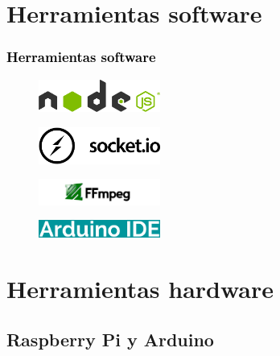 \documentclass[xcolor=x11names,compress]{beamer}
\theoremstyle{cuadrado}
\begin{document}
{{\begin{adjustwidth}{-2em}{-1em}
\end{adjustwidth}

}


\section{Herramientas software}

\frametitle{\textcolor{black}{Herramientas software}}

\begin{figure}[H]
  \includegraphics[width=4cm]{nodejs-logo.png}
\end{figure}

\begin{figure}[H]
  \includegraphics[width=4cm]{socketio-logo.png}
\end{figure}


\begin{figure}[H]
  \includegraphics[width=4cm]{ffmpeg-logo.jpg}
\end{figure}

\begin{figure}[H]
  \includegraphics[width=4cm]{arduino_ide_logo.png}
\end{figure}
}

\section{Herramientas hardware}


\subsection{Raspberry Pi y Arduino}
\end{document}

